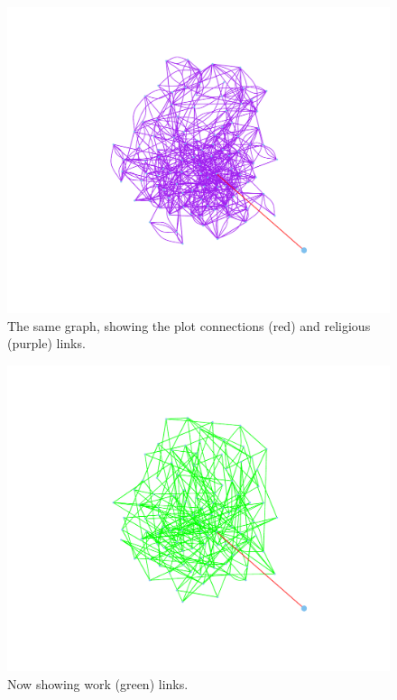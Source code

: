 \documentclass{article}
\newenvironment{rnwfig}[0]{\begin{figure}\begin{center}}{\end{center}\end{figure}}
\begin{document}
\begin{rnwfig}
\includegraphics{manuscript-religion}
\caption{The same graph, showing the plot connections (red) and religious (purple) links.}
\end{rnwfig}

\begin{rnwfig}
\includegraphics{manuscript-work}
\caption{Now showing work (green) links.}
\end{rnwfig}
\end{document}
